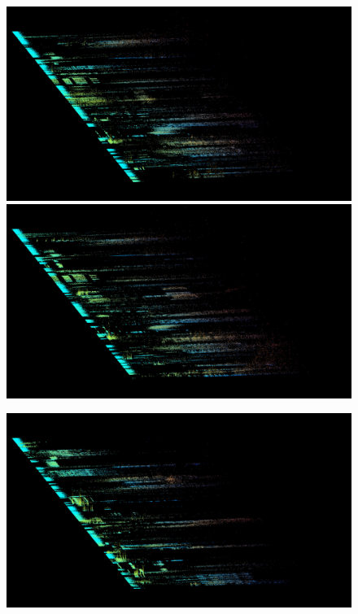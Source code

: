 \documentclass{article}
\begin{document}
\begin{figure}

\begin{multicols}{2}
    \includegraphics[width=\linewidth]{preset-50-13.jpg}%
    \includegraphics[width=\linewidth]{preset-50-14.jpg}%
\end{multicols}
\begin{multicols}{2}
    \includegraphics[width=\linewidth]{preset-50-5.jpg}%

\end{multicols}
\end{figure}
\end{document}
